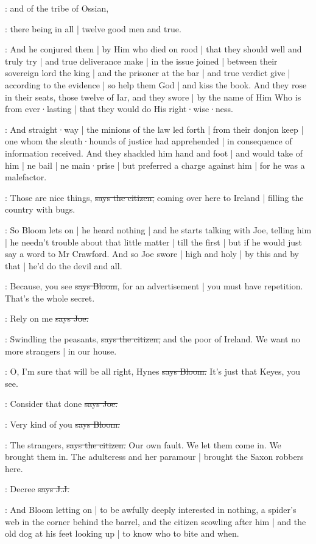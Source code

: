 :
and of the tribe of Ossian,

:
there being in all
 |
twelve good men and true.

:
And he conjured them |
by Him who died on rood |
that they should well and truly try |
and true deliverance make |
in the issue joined |
between their sovereign lord the king |
and the prisoner at the bar |
and true verdict give |
according to the evidence |
so help them God |
and kiss the book.
And they rose in their seats,
those twelve of Iar,
and they swore |
by the name of Him Who is from ever·lasting |
that they would do His right·wise·ness.

:
And straight·way |
the minions of the law led forth |
from their donjon keep |
one whom the sleuth·hounds of justice had apprehended |
in consequence of information received.
And they shackled him hand and foot |
and would take of him |
ne bail |
ne main·prise |
but preferred a charge against him
 |
for he was a malefactor.

\citizen:
Those are nice things,
\sout{says the citizen,}
coming over here to Ireland |
filling the country with bugs.

\Nq:
So Bloom lets on |
he heard nothing |
and he starts talking with Joe,
telling him |
he needn't trouble about that little matter |
till the first |
but if he would just say a word to Mr Crawford.
And so Joe swore |
high and holy |
by this and by that |
he'd do the devil and all.

\Bloom:
Because,
you see
\sout{says Bloom},
for an advertisement |
you must have repetition.
That's the whole secret.

\joe:
Rely on me
\sout{says Joe.}

\citizen:
Swindling the peasants,
\sout{says the citizen,}
and the poor of Ireland.
We want no more strangers |
in our house.

\Bloom:
O,
I'm sure that will be all right,
Hynes
\sout{says Bloom.}
It's just that Keyes,
you see.

\joe:
Consider that done
\sout{says Joe.}

\Bloom:
Very kind of you
\sout{says Bloom.}

\citizen:
The strangers,
\sout{says the citizen.}
Our own fault.
We let them come in.
We brought them in.
The adulteress and her paramour |
brought the Saxon robbers here.

\jjom:
Decree 
\sout{says J.J.}

\Nq:
And Bloom letting on |
to be awfully deeply interested in nothing,
a spider's web in the corner behind the barrel,
and the citizen scowling after him |
and the old dog at his feet looking up |
to know who to bite and when.

